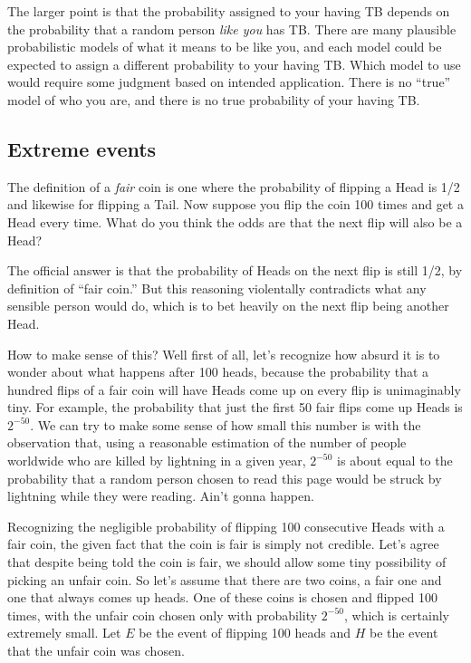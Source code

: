 The larger point is that the probability assigned to your having TB
depends on the probability that a random person \emph{like you} has
TB.  There are many plausible probabilistic models of what it means to
be like you, and each model could be expected to assign a different
probability to your having TB.  Which model to use would require some
judgment based on intended application.  There is no ``true'' model of
who you are, and there is no true probability of your having TB.

\subsection{Extreme events}

The definition of a \emph{fair} coin is one where the probability of
flipping a Head is 1/2 and likewise for flipping a Tail.  Now suppose
you flip the coin 100 times and get a Head every time.  What do you
think the odds are that the next flip will also be a Head?

The official answer is that the probability of Heads on the next flip
is still 1/2, by definition of ``fair coin.''  But this reasoning
violentally contradicts what any sensible person would do, which is to
bet heavily on the next flip being another Head.

How to make sense of this?  Well first of all, let's recognize how
absurd it is to wonder about what happens after 100 heads, because the
probability that a hundred flips of a fair coin will have Heads come
up on every flip is unimaginably tiny.  For example, the probability
that just the first 50 fair flips come up Heads is $2^{-50}$.  We can
try to make some sense of how small this number is with the
observation that, using a reasonable estimation of the number of
people worldwide who are killed by lightning in a given year,
$2^{-50}$ is about equal to the probability that a random person
chosen to read this page would be struck by lightning while they were
reading.  Ain't gonna happen.

Recognizing the negligible probability of flipping 100 consecutive
Heads with a fair coin, the given fact that the coin is fair is simply
not credible.  Let's agree that despite being told the coin is fair,
we should allow some tiny possibility of picking an unfair coin.  So
let's assume that there are two coins, a fair one and one that always
comes up heads.  One of these coins is chosen and flipped 100 times,
with the unfair coin chosen only with probability $2^{-50}$, which is
certainly extremely small.  Let $E$ be the event of flipping 100 heads
and $H$ be the event that the unfair coin was chosen.


